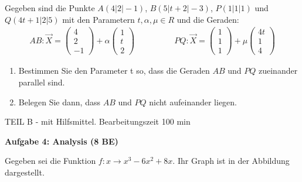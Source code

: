 \documentclass[a4paper,12pt]{article}
\newcommand{\Aufgabe}[1]{
  {
  \vspace*{0.5cm}
  \textsf{\textbf{Aufgabe #1}}
  \vspace*{0.2cm}
  
  }
}
\begin{document}
 Gegeben sind die Punkte  $ A(4 | 2 |-1)$, $ B(5 | t+2 |-3)$, $ P(1 | 1 |1)$ und $ Q(4t+1 | 2 |5)$ mit den  Parametern $t, \alpha, \mu  \in R$
und die Geraden:
\[
\begin {aligned}
   AB: \vec{X}= \begin{pmatrix} 4 \\
                              2 \\
                                -1
                  \end{pmatrix}
           + \alpha \begin{pmatrix} 1 \\
                                t\\
                                2
                  \end{pmatrix}
\end {aligned}
\qquad
\qquad
\begin {aligned}
    PQ: \vec{X}= \begin{pmatrix} 1\\
                              1 \\
                                1
                  \end{pmatrix}
           + \mu \begin{pmatrix} 4t \\
                                1 \\
                                4
                  \end{pmatrix}
\end {aligned}
\]
\begin{enumerate}[label={\alph*)}] 
\item Bestimmen Sie den Parameter t so, dass die Geraden $AB$ und $PQ$ zueinander parallel sind.
\item Belegen Sie dann, dass $AB$ und $PQ$ nicht aufeinander liegen.
\end{enumerate}



\newpage
\vspace*{-4\baselineskip}
\enlargethispage{3cm}
{TEIL B} - mit Hilfsmittel. Bearbeitungszeit 100 min


\Aufgabe{4: Analysis (8 BE)}
Gegeben sei die Funktion $f: x\rightarrow x^3-6x^2+8x $.
Ihr Graph ist in der Abbildung dargestellt.\\
\end{document}
